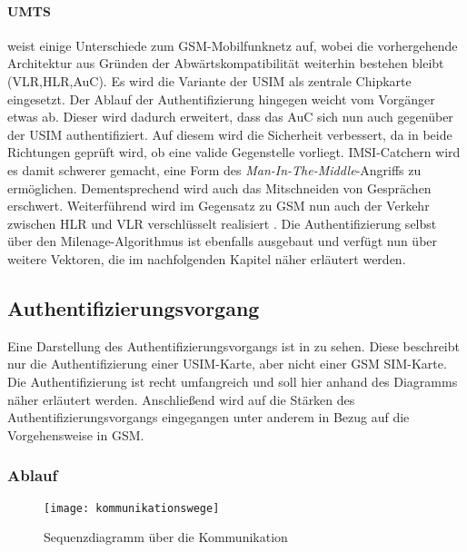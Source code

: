 \paragraph{UMTS} weist einige Unterschiede zum GSM-Mobilfunknetz auf, wobei die
vorhergehende Architektur aus Gründen der Abwärtskompatibilität weiterhin bestehen bleibt
(\ac{VLR},\ac{HLR},\ac{AuC}). Es wird die Variante der USIM als zentrale Chipkarte
eingesetzt. Der Ablauf der Authentifizierung hingegen weicht vom Vorgänger etwas ab.
Dieser wird dadurch erweitert, dass das \ac{AuC} sich nun auch gegenüber der \ac{USIM}
authentifiziert. Auf diesem wird die Sicherheit verbessert, da in beide Richtungen
geprüft wird, ob eine valide Gegenstelle vorliegt. \ac{IMSI}-Catchern wird es damit
schwerer gemacht, eine Form des \textit{Man-In-The-Middle}-Angriffs zu ermöglichen.
Dementsprechend wird auch das Mitschneiden von Gesprächen erschwert. Weiterführend
wird im Gegensatz zu \ac{GSM} nun auch der Verkehr zwischen \ac{HLR} und \ac{VLR}
verschlüsselt realisiert \cite{spitz11}.
Die Authentifizierung selbst über den Milenage-Algorithmus ist ebenfalls ausgebaut
und verfügt nun über weitere Vektoren, die im nachfolgenden Kapitel näher
erläutert werden.

\subsection[Authentifizierungsvorgang (Heumann)]{Authentifizierungsvorgang}
\label{authentifizierungsvorgang}

Eine Darstellung des Authentifizierungsvorgangs ist in  zu
sehen. Diese beschreibt nur die Authentifizierung einer \ac{USIM}-Karte, aber nicht einer
GSM \ac{SIM}-Karte. \\
Die Authentifizierung ist recht umfangreich und soll hier anhand des Diagramms näher
erläutert werden. Anschließend wird auf die Stärken des Authentifizierungs\-vorgangs
eingegangen unter anderem in Bezug auf die Vorgehensweise in GSM.

 \subsubsection[Ablauf (Heumann)]{Ablauf}
 
 \begin{figure}[htp]
 \begin{center}
  \texttt{[image: kommunikationswege]}
 \end{center}
 \caption[Sequenzdiagramm über die Kommunikation zwischen SIM-Karte und Authentication Center]{Sequenzdiagramm über die Kommunikation}
 \label{fig:kommunikationswege}
\end{figure}

